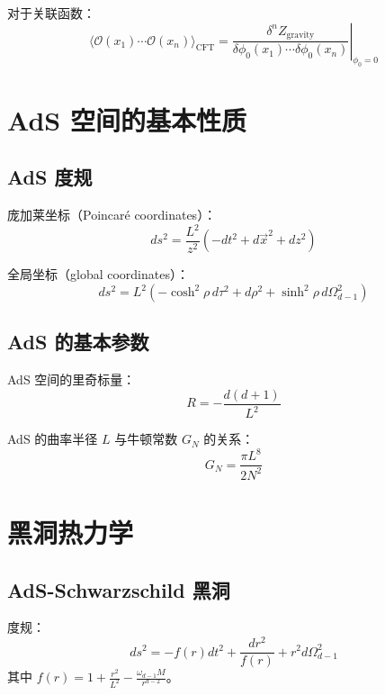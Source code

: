\documentclass[12pt,a4paper]{ctexart}
\begin{document}
对于关联函数：
\begin{equation}
    \langle \mathcal{O}(x_1) \cdots \mathcal{O}(x_n) \rangle_{\text{CFT}}
    = \left. \frac{\delta^n Z_{\text{gravity}}}{\delta \phi_0(x_1) \cdots \delta \phi_0(x_n)} \right|_{\phi_0 = 0}
\end{equation}

\section{AdS 空间的基本性质}

\subsection{AdS 度规}

庞加莱坐标（Poincaré coordinates）：
\begin{equation}
    ds^2 = \frac{L^2}{z^2} \left( -dt^2 + d\vec{x}^2 + dz^2 \right)
\end{equation}

全局坐标（global coordinates）：
\begin{equation}
    ds^2 = L^2 \left( -\cosh^2\rho \, d\tau^2 + d\rho^2 + \sinh^2\rho \, d\Omega_{d-1}^2 \right)
\end{equation}

\subsection{AdS 的基本参数}

AdS 空间的里奇标量：
\begin{equation}
    R = -\frac{d(d+1)}{L^2}
\end{equation}

AdS 的曲率半径 $L$ 与牛顿常数 $G_N$ 的关系：
\begin{equation}
    G_N = \frac{\pi L^8}{2 N^2}
\end{equation}

\section{黑洞热力学}

\subsection{AdS-Schwarzschild 黑洞}

度规：
\begin{equation}
    ds^2 = -f(r) dt^2 + \frac{dr^2}{f(r)} + r^2 d\Omega_{d-1}^2
\end{equation}
其中 $f(r) = 1 + \frac{r^2}{L^2} - \frac{\omega_{d-1} M}{r^{d-2}}$。
\end{document}
